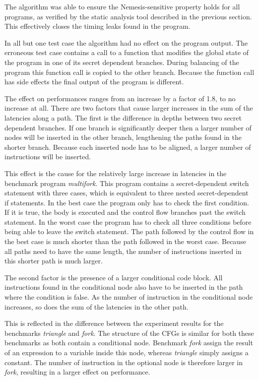 The algorithm was able to ensure the Nemesis-sensitive property holds for all programs, as verified by the static analysis tool described in the previous section. This effectively closes the 
timing leaks found in the program. 

In all but one test case the algorithm had no effect on the program output. 
The erroneous test case contains a call to a function that modifies the global state of the program in one of its secret dependent branches. 
During balancing of the program this function call is copied to the other branch. 
Because the function call has side effects the final output of the program is different. 

The effect on performances ranges from an increase by a factor of 1.8, to no increase at all. 
There are two factors that cause larger increases in the sum of the latencies along a path. The first is the difference in depths between two secret dependent branches. 
If one branch is significantly deeper then a larger number of nodes will be inserted in the other branch, lengthening the paths found in the shorter branch. 
Because each inserted node has to be aligned, a larger number of instructions will be inserted. 

This effect is the cause for the relatively large increase in latencies in the benchmark  program \textit{multifork}. 
This program contains a secret-dependent switch statement with three cases, which is equivalent to three nested secret-dependent if statements. 
In the best case the program only has to check the first condition. If it is true, the body is executed and the control flow branches past the switch statement. 
In the worst case the program has to check all three conditions before being able to leave the switch statement. 
The path followed by the control flow in the best case is much shorter than the path followed in the worst case. 
Because all paths need to have the same length, the number of instructions inserted in this shorter path is much larger. 

The second factor is the presence of a larger conditional code block. All instructions found in the conditional node also have to be inserted in the path where the condition is false. 
As the number of instruction in the conditional node increases, so does the sum of the latencies in the other path.

This is reflected in the difference between the experiment results for the benchmarks \textit{triangle} and \textit{fork}. The structure of the CFGs is similar for both these benchmarks as both contain a conditional node.
Benchmark \textit{fork} assign the result of an expression to a variable inside this node, whereas \textit{triangle} simply assigns a constant. The number of instruction in the optional node is therefore larger in \textit{fork}, resulting 
in a larger effect on performance.

